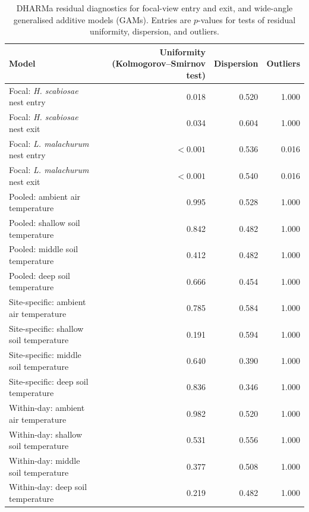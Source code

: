 \documentclass[11pt,a4paper]{article}
\begin{document}

\begin{table}[!htbp]
\centering
\small
\caption{DHARMa residual diagnostics for focal-view entry and exit, and wide-angle generalised additive models (GAMs). Entries are $p$-values for tests of residual uniformity, dispersion, and outliers.}
\label{tab:dharma}

\begin{tabular}{lrrr}
\toprule
Model & Uniformity (Kolmogorov--Smirnov test) & Dispersion & Outliers \\
\midrule
Focal: \textit{H. scabiosae} nest entry & 0.018 & 0.520 & 1.000 \\
Focal: \textit{H. scabiosae} nest exit & 0.034 & 0.604 & 1.000 \\
Focal: \textit{L. malachurum} nest entry & $<0.001$ & 0.536 & 0.016 \\
Focal: \textit{L. malachurum} nest exit & $<0.001$ & 0.540 & 0.016 \\
Pooled: ambient air temperature & 0.995 & 0.528 & 1.000 \\
Pooled: shallow soil temperature & 0.842 & 0.482 & 1.000 \\
Pooled: middle soil temperature & 0.412 & 0.482 & 1.000 \\
Pooled: deep soil temperature & 0.666 & 0.454 & 1.000 \\
Site-specific: ambient air temperature & 0.785 & 0.584 & 1.000 \\
Site-specific: shallow soil temperature & 0.191 & 0.594 & 1.000 \\
Site-specific: middle soil temperature & 0.640 & 0.390 & 1.000 \\
Site-specific: deep soil temperature & 0.836 & 0.346 & 1.000 \\
Within-day: ambient air temperature & 0.982 & 0.520 & 1.000 \\
Within-day: shallow soil temperature & 0.531 & 0.556 & 1.000 \\
Within-day: middle soil temperature & 0.377 & 0.508 & 1.000 \\
Within-day: deep soil temperature & 0.219 & 0.482 & 1.000 \\
\bottomrule
\end{tabular}
\end{table}

\end{document}
